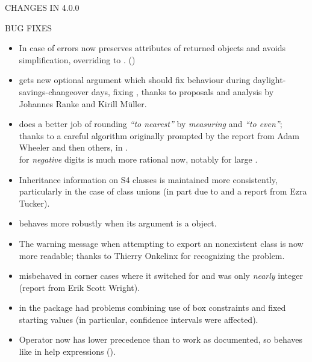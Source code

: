 \documentclass[letterpaper]{book}
\begin{document}
\begin{Section}{ CHANGES IN 4.0.0}
\begin{SubSection}{BUG FIXES}
\begin{itemize}
\item{} In case of errors  now preserves attributes
of returned  objects and avoids simplification,
overriding  to . ()

\item{}  gets new optional 
argument which should fix behaviour during
daylight-savings-changeover days, fixing , thanks to
proposals and analysis by Johannes Ranke and Kirill Müller.

\item{}  does a better job of rounding
\emph{``to nearest''} by \emph{measuring} and
\emph{``to even''}; thanks to a careful algorithm originally
prompted by the report from Adam Wheeler and then others, in
.  \\{}  for \emph{negative} digits
is much more rational now, notably for large .

\item{} Inheritance information on S4 classes is maintained more
consistently, particularly in the case of class unions (in part
due to  and a report from Ezra Tucker).

\item{}  behaves more robustly when its argument
 is a  object.

\item{} The warning message when attempting to export an nonexistent
class is now more readable; thanks to Thierry Onkelinx for
recognizing the problem.

\item{}  misbehaved in corner cases where it switched
 for  and  was only \emph{nearly} integer
(report from Erik Scott Wright).

\item{}  in the  package had problems
combining use of box constraints and fixed starting values (in
particular, confidence intervals were affected).

\item{} Operator  now has lower precedence than \code{=} to
work as documented, so \code{=} behaves like \code{<-} in help
expressions ().


\end{itemize}
\end{SubSection}
\end{Section}
\end{document}
